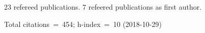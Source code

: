 23 refereed publications. 7 refeered publications as first author.

Total citations~=~454; h-index~=~10 (2018-10-29)